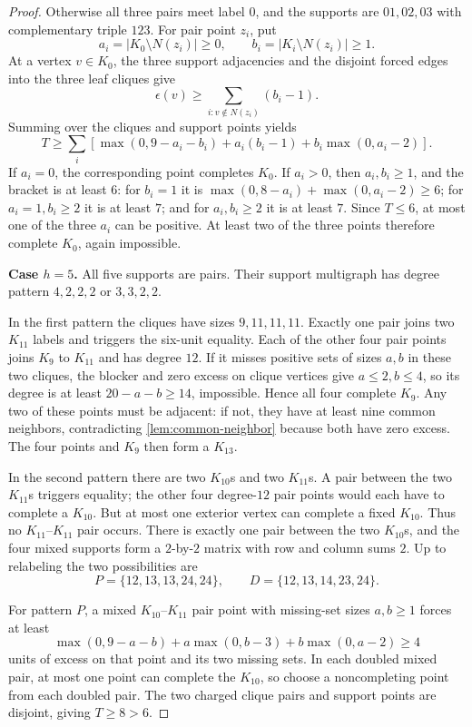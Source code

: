 \begin{proof}
Otherwise all three pairs meet label $0$, and the supports are $01,02,03$ with complementary triple $123$. For pair point $z_i$, put
\[
a_i=|K_0\setminus N(z_i)|\geq0,\qquad
b_i=|K_i\setminus N(z_i)|\geq1.
\]
At a vertex $v\in K_0$, the three support adjacencies and the disjoint forced edges into the three leaf cliques give
\[
\epsilon(v)\geq
\sum_{i:v\notin N(z_i)}(b_i-1).
\]
Summing over the cliques and support points yields
\[
T\geq\sum_i\left[
\max(0,9-a_i-b_i)+a_i(b_i-1)+b_i\max(0,a_i-2)
\right].
\]
If $a_i=0$, the corresponding point completes $K_0$. If $a_i>0$, then $a_i,b_i\geq1$, and the bracket is at least $6$: for $b_i=1$ it is $\max(0,8-a_i)+\max(0,a_i-2)\geq6$; for $a_i=1,b_i\geq2$ it is at least $7$; and for $a_i,b_i\geq2$ it is at least $7$. Since $T\leq6$, at most one of the three $a_i$ can be positive. At least two of the three points therefore complete $K_0$, again impossible.

\medskip
\noindent\textbf{Case $h=5$.}
All five supports are pairs. Their support multigraph has degree pattern $4,2,2,2$ or $3,3,2,2$.

In the first pattern the cliques have sizes $9,11,11,11$. Exactly one pair joins two $K_{11}$ labels and triggers the six-unit equality. Each of the other four pair points joins $K_9$ to $K_{11}$ and has degree $12$. If it misses positive sets of sizes $a,b$ in these two cliques, the blocker and zero excess on clique vertices give $a\leq2,b\leq4$, so its degree is at least $20-a-b\geq14$, impossible. Hence all four complete $K_9$. Any two of these points must be adjacent: if not, they have at least nine common neighbors, contradicting \cref{lem:common-neighbor} because both have zero excess. The four points and $K_9$ then form a $K_{13}$.

In the second pattern there are two $K_{10}$s and two $K_{11}$s. A pair between the two $K_{11}$s triggers equality; the other four degree-$12$ pair points would each have to complete a $K_{10}$. But at most one exterior vertex can complete a fixed $K_{10}$. Thus no $K_{11}$--$K_{11}$ pair occurs. There is exactly one pair between the two $K_{10}$s, and the four mixed supports form a $2$-by-$2$ matrix with row and column sums $2$. Up to relabeling the two possibilities are
\[
P=\{12,13,13,24,24\},\qquad
D=\{12,13,14,23,24\}.
\]

For pattern $P$, a mixed $K_{10}$--$K_{11}$ pair point with missing-set sizes $a,b\geq1$ forces at least
\[
\max(0,9-a-b)+a\max(0,b-3)+b\max(0,a-2)\geq4
\]
units of excess on that point and its two missing sets. In each doubled mixed pair, at most one point can complete the $K_{10}$, so choose a noncompleting point from each doubled pair. The two charged clique pairs and support points are disjoint, giving $T\geq8>6$.


\end{proof}
